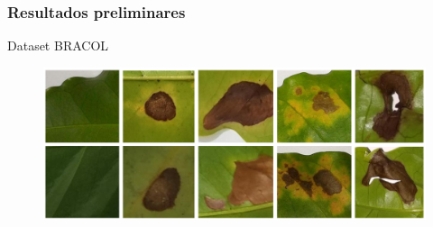 \documentclass[aspectratio=169]{beamer}
\begin{document}



\begin{frame}
    \frametitle{Resultados preliminares}


    \centering
    Dataset BRACOL

    \begin{figure}
        \centering
        \includegraphics[scale = 0.27]{img/SintomDatasetExample.png}
        \label{fig:enter-label}
    \end{figure}

\end{frame}
















\end{document}
